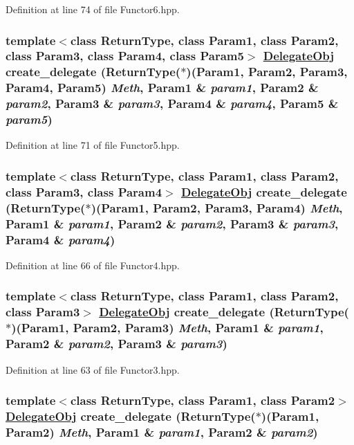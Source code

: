 Definition at line 74 of file Functor6.hpp.\hypertarget{namespaceDL_a29}{
\subsubsection[create\_\-delegate]{\setlength{\rightskip}{0pt plus 5cm}template$<$class Return\-Type, class Param1, class Param2, class Param3, class Param4, class Param5$>$ \hyperlink{namespaceDL_a0}{Delegate\-Obj} create\_\-delegate (Return\-Type($\ast$)(Param1, Param2, Param3, Param4, Param5) {\em Meth}, Param1 \& {\em param1}, Param2 \& {\em param2}, Param3 \& {\em param3}, Param4 \& {\em param4}, Param5 \& {\em param5})}}
\label{namespaceDL_a29}




Definition at line 71 of file Functor5.hpp.\hypertarget{namespaceDL_a28}{
\subsubsection[create\_\-delegate]{\setlength{\rightskip}{0pt plus 5cm}template$<$class Return\-Type, class Param1, class Param2, class Param3, class Param4$>$ \hyperlink{namespaceDL_a0}{Delegate\-Obj} create\_\-delegate (Return\-Type($\ast$)(Param1, Param2, Param3, Param4) {\em Meth}, Param1 \& {\em param1}, Param2 \& {\em param2}, Param3 \& {\em param3}, Param4 \& {\em param4})}}
\label{namespaceDL_a28}




Definition at line 66 of file Functor4.hpp.\hypertarget{namespaceDL_a27}{
\subsubsection[create\_\-delegate]{\setlength{\rightskip}{0pt plus 5cm}template$<$class Return\-Type, class Param1, class Param2, class Param3$>$ \hyperlink{namespaceDL_a0}{Delegate\-Obj} create\_\-delegate (Return\-Type($\ast$)(Param1, Param2, Param3) {\em Meth}, Param1 \& {\em param1}, Param2 \& {\em param2}, Param3 \& {\em param3})}}
\label{namespaceDL_a27}




Definition at line 63 of file Functor3.hpp.\hypertarget{namespaceDL_a26}{
\subsubsection[create\_\-delegate]{\setlength{\rightskip}{0pt plus 5cm}template$<$class Return\-Type, class Param1, class Param2$>$ \hyperlink{namespaceDL_a0}{Delegate\-Obj} create\_\-delegate (Return\-Type($\ast$)(Param1, Param2) {\em Meth}, Param1 \& {\em param1}, Param2 \& {\em param2})}}
\label{namespaceDL_a26}




